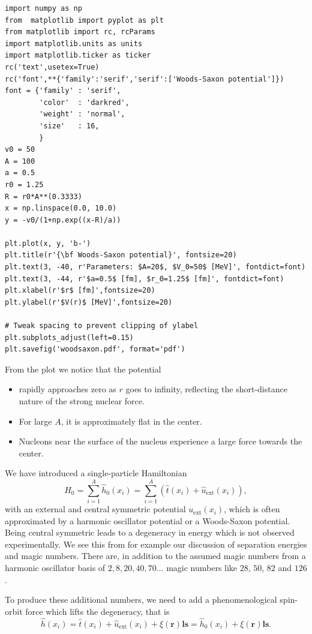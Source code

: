 \documentclass[%
oneside,                 %
final,                   %
10pt]{article}
\begin{document}
\begin{verbatim}
import numpy as np
from  matplotlib import pyplot as plt
from matplotlib import rc, rcParams
import matplotlib.units as units
import matplotlib.ticker as ticker
rc('text',usetex=True)
rc('font',**{'family':'serif','serif':['Woods-Saxon potential']})
font = {'family' : 'serif',
        'color'  : 'darkred',
        'weight' : 'normal',
        'size'   : 16,
        }
v0 = 50
A = 100
a = 0.5
r0 = 1.25
R = r0*A**(0.3333)
x = np.linspace(0.0, 10.0)
y = -v0/(1+np.exp((x-R)/a))

plt.plot(x, y, 'b-')
plt.title(r'{\bf Woods-Saxon potential}', fontsize=20)     
plt.text(3, -40, r'Parameters: $A=20$, $V_0=50$ [MeV]', fontdict=font)
plt.text(3, -44, r'$a=0.5$ [fm], $r_0=1.25$ [fm]', fontdict=font)
plt.xlabel(r'$r$ [fm]',fontsize=20)
plt.ylabel(r'$V(r)$ [MeV]',fontsize=20)

# Tweak spacing to prevent clipping of ylabel
plt.subplots_adjust(left=0.15)
plt.savefig('woodsaxon.pdf', format='pdf')
\end{verbatim}
From the plot we notice that the potential
\begin{itemize}
\item rapidly approaches zero as $r$ goes to infinity, reflecting the short-distance nature of the strong nuclear force.

\item For large $A$, it is approximately flat in the center.

\item Nucleons near the surface of the nucleus experience a large force towards the center.
\end{itemize}

\noindent
We have introduced a single-particle Hamiltonian
\[
  H_0=\sum_{i=1}^A \hat{h}_0(x_i) =  \sum_{i=1}^A\left(\hat{t}(x_i) + \hat{u}_{\mathrm{ext}}(x_i)\right),
\]
with an external and central symmetric potential $u_{\mathrm{ext}}(x_i)$, which is often 
approximated by a harmonic oscillator potential or a Woods-Saxon potential. Being central symmetric leads to a degeneracy 
in energy which is not observed experimentally. We see this from for example our discussion of separation energies and magic numbers. There are, in addition to the assumed magic numbers from a harmonic oscillator basis of $2,8,20,40,70\dots$ magic numbers like $28$, $50$, $82$ and $126$. 

To produce these additional numbers, we need to add a phenomenological spin-orbit force which lifts the degeneracy, that is
\[
\hat{h}(x_i) =  \hat{t}(x_i) + \hat{u}_{\mathrm{ext}}(x_i) +\xi(\bm{r})\bm{ls}=\hat{h}_0(x_i)+\xi(\bm{r})\bm{ls}. 
\]
\end{document}
